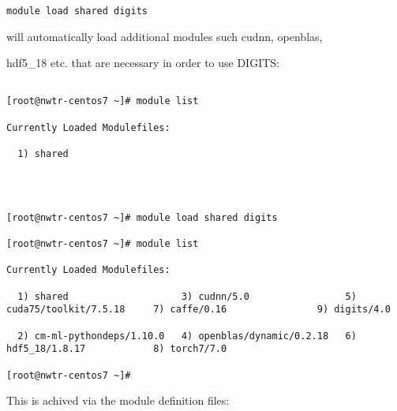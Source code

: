 \documentclass[]{article}
\begin{document}
\begin{verbatim}



module load shared digits

\end{verbatim}



will automatically load additional modules such cudnn, openblas,

hdf5\_18 etc. that are necessary in order to use DIGITS:



\begin{verbatim}

[root@nwtr-centos7 ~]# module list

Currently Loaded Modulefiles:

  1) shared

\end{verbatim}



\begin{verbatim}



[root@nwtr-centos7 ~]# module load shared digits

[root@nwtr-centos7 ~]# module list

Currently Loaded Modulefiles:

  1) shared                    3) cudnn/5.0                 5) cuda75/toolkit/7.5.18     7) caffe/0.16                9) digits/4.0

  2) cm-ml-pythondeps/1.10.0   4) openblas/dynamic/0.2.18   6) hdf5_18/1.8.17            8) torch7/7.0

[root@nwtr-centos7 ~]#

\end{verbatim}



This is achived via the module definition files:
\end{document}
